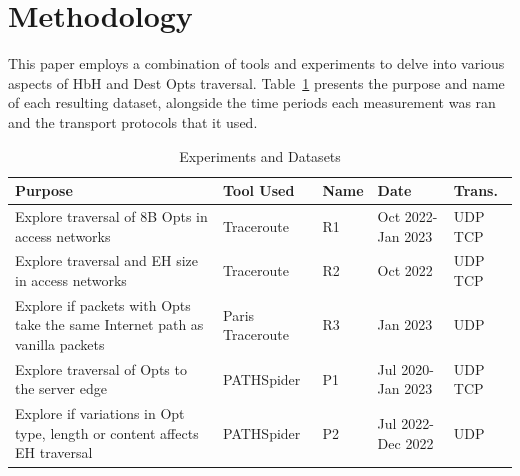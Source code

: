 \documentclass[conference]{IEEEtran}
\begin{document}







\section{Methodology} 
\label{sec:methodology}

This paper employs a combination of tools and experiments to delve into various aspects of HbH and Dest Opts traversal. Table~\ref{tbl:datasets} presents the purpose and name of each resulting dataset, alongside the time periods each measurement was ran and the transport protocols that it used.

\begin{table}
\begin{tabular}{p{}|p{}|p{}|p{}|p{}}
Purpose                                                                          & Tool Used        & Name & Date               & Trans. \\
\hline
Explore traversal of 8B Opts in access networks                                  & Traceroute       & R1           & Oct 2022- Jan 2023 & UDP TCP          \\
\hline
Explore traversal and EH size in access networks                                & Traceroute       & R2           & Oct 2022           & UDP TCP          \\
\hline
Explore if packets with Opts take the same Internet path as vanilla packets & Paris Traceroute & R3           & Jan 2023           & UDP               \\
\hline
Explore traversal of Opts to the server edge                              & PATHSpider       & P1           & Jul 2020- Jan 2023 & UDP TCP          \\
\hline
Explore if variations in Opt type, length or content affects EH traversal   & PATHSpider       & P2           & Jul 2022- Dec 2022     & UDP              
\end{tabular}
  \caption{Experiments and Datasets}
  \label{tbl:datasets}
\end{table}
\end{document}
